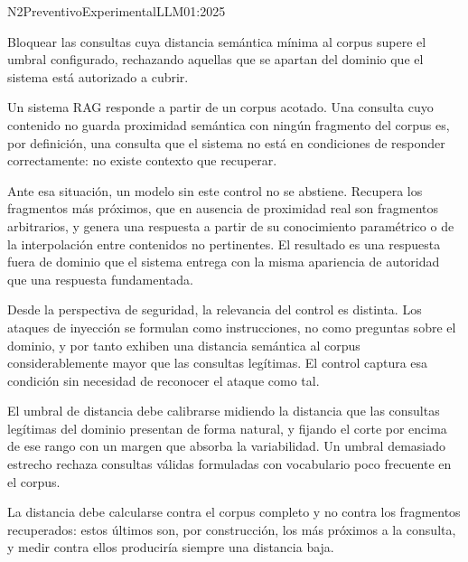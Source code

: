 
  {N2}{Preventivo}{Experimental}{LLM01:2025}

Bloquear las consultas cuya distancia semántica mínima al corpus supere el umbral configurado, rechazando aquellas que se apartan del dominio que el sistema está autorizado a cubrir.

Un sistema RAG responde a partir de un corpus acotado. Una consulta cuyo contenido no guarda proximidad semántica con ningún fragmento del corpus es, por definición, una consulta que el sistema no está en condiciones de responder correctamente: no existe contexto que recuperar.

Ante esa situación, un modelo sin este control no se abstiene. Recupera los fragmentos más próximos, que en ausencia de proximidad real son fragmentos arbitrarios, y genera una respuesta a partir de su conocimiento paramétrico o de la interpolación entre contenidos no pertinentes. El resultado es una respuesta fuera de dominio que el sistema entrega con la misma apariencia de autoridad que una respuesta fundamentada.

Desde la perspectiva de seguridad, la relevancia del control es distinta. Los ataques de inyección se formulan como instrucciones, no como preguntas sobre el dominio, y por tanto exhiben una distancia semántica al corpus considerablemente mayor que las consultas legítimas. El control captura esa condición sin necesidad de reconocer el ataque como tal.

El umbral de distancia debe calibrarse midiendo la distancia que las consultas legítimas del dominio presentan de forma natural, y fijando el corte por encima de ese rango con un margen que absorba la variabilidad. Un umbral demasiado estrecho rechaza consultas válidas formuladas con vocabulario poco frecuente en el corpus.

La distancia debe calcularse contra el corpus completo y no contra los fragmentos recuperados: estos últimos son, por construcción, los más próximos a la consulta, y medir contra ellos produciría siempre una distancia baja.

